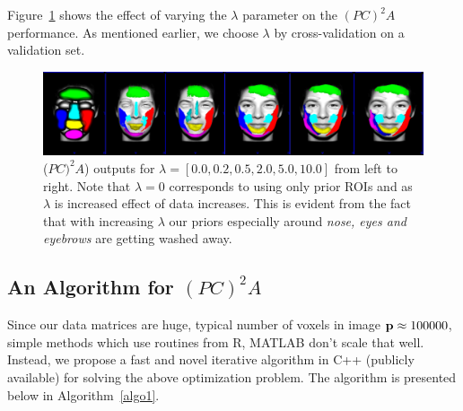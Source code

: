 \documentclass{llncs}
\begin{document}
Figure~\ref{fig:priorvary} shows the effect of varying the $\lambda$ parameter on the $(PC)^2A$ performance. As mentioned earlier, we choose $\lambda$ by cross-validation on a validation set.

\begin{figure}
\begin{center}
\includegraphics[width=\linewidth]{fig2.pdf} 
\end{center}
\vspace{-0.2in}
\caption{($PC)^2A$) outputs for $\lambda=[0.0,0.2,0.5,2.0,5.0,10.0]$ from left to right. Note that $\lambda =0$ corresponds to using only prior ROIs and as $\lambda$ is increased effect of data increases. This is evident from the fact that with increasing $\lambda$ our priors especially around {\em nose, eyes and eyebrows} are getting washed away.}
\label{fig:priorvary}
\end{figure}



\subsection{An Algorithm for $(PC)^2A$}
Since our data matrices are huge, typical number of voxels in image ${\bf p}\approx 100000$, simple methods which use routines from R, MATLAB don't scale that well. Instead, we propose a fast and novel iterative algorithm in C++ (publicly available) for solving the above optimization problem. The algorithm is presented below in Algorithm~\ref{algo1}.
\end{document}
